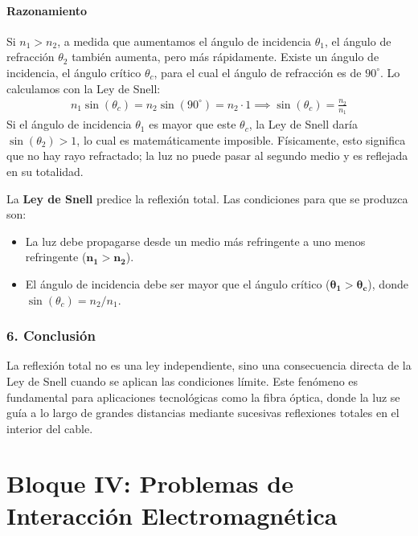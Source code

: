 \paragraph{Razonamiento}
Si $n_1 > n_2$, a medida que aumentamos el ángulo de incidencia $\theta_1$, el ángulo de refracción $\theta_2$ también aumenta, pero más rápidamente. Existe un ángulo de incidencia, el ángulo crítico $\theta_c$, para el cual el ángulo de refracción es de $90^\circ$. Lo calculamos con la Ley de Snell:
\begin{gather}
    n_1 \sin(\theta_c) = n_2 \sin(90^\circ) = n_2 \cdot 1 \implies \sin(\theta_c) = \frac{n_2}{n_1}
\end{gather}
Si el ángulo de incidencia $\theta_1$ es mayor que este $\theta_c$, la Ley de Snell daría $\sin(\theta_2) > 1$, lo cual es matemáticamente imposible. Físicamente, esto significa que no hay rayo refractado; la luz no puede pasar al segundo medio y es reflejada en su totalidad.

\begin{cajaresultado}
La \textbf{Ley de Snell} predice la reflexión total. Las condiciones para que se produzca son:
\begin{itemize}
    \item La luz debe propagarse desde un medio más refringente a uno menos refringente ($\boldsymbol{n_1 > n_2}$).
    \item El ángulo de incidencia debe ser mayor que el ángulo crítico ($\boldsymbol{\theta_1 > \theta_c}$), donde $\sin(\theta_c) = n_2/n_1$.
\end{itemize}
\end{cajaresultado}

\subsubsection*{6. Conclusión}
\begin{cajaconclusion}
La reflexión total no es una ley independiente, sino una consecuencia directa de la Ley de Snell cuando se aplican las condiciones límite. Este fenómeno es fundamental para aplicaciones tecnológicas como la fibra óptica, donde la luz se guía a lo largo de grandes distancias mediante sucesivas reflexiones totales en el interior del cable.
\end{cajaconclusion}

\newpage

\section{Bloque IV: Problemas de Interacción Electromagnética}
\label{sec:em_2008_jun_ord}

